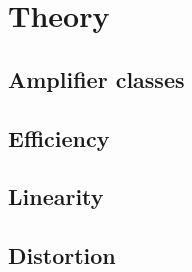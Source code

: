 \chapter{Theory}

\section{Amplifier classes}

\section{Efficiency}

\section{Linearity}

\section{Distortion}
